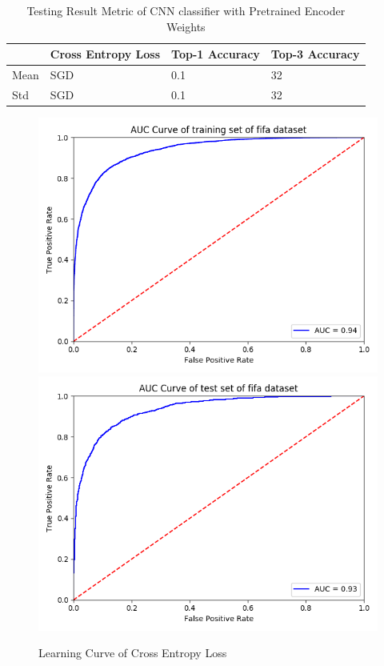\documentclass{article}
\begin{document}
\begin{table}[htb]
\caption{Testing Result Metric of CNN classifier with Pretrained Encoder Weights}
	\label{sample-table}
	\centering
\begin{tabular}{llll}
\toprule
		\cmidrule{1-4}
		& Cross Entropy Loss & Top-1 Accuracy & Top-3 Accuracy 		\\
	\midrule
 	Mean & SGD & 0.1 & 32  \\
 	Std & SGD & 0.1 & 32 \\
\bottomrule
\end{tabular}
\end{table}

\pagebreak

\begin{figure}[h]
  \centering
  \includegraphics[scale=0.3]{fifa_auc_train.png}
  \includegraphics[scale=0.3]{fifa_auc_test.png}
  \caption{Learning Curve of Cross Entropy Loss}
\end{figure}
\end{document}
